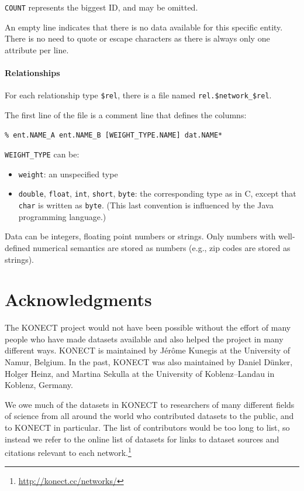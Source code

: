 \documentclass{article}
\begin{document}
\texttt{COUNT} represents the biggest ID, and may be omitted.

An empty line indicates that there is no data available for this specific entity.
There is no need to quote or escape characters as there is always only one attribute per line.

\paragraph{Relationships}

For each relationship type \texttt{\$rel}, there is a file named
\texttt{rel.\$network\_\$rel}. 

The first line of the file is a comment line that defines the columns: 

\texttt{\% ent.NAME\_A ent.NAME\_B [WEIGHT\_TYPE.NAME] dat.NAME*}

\texttt{WEIGHT\_TYPE} can be:
\begin{itemize}
  \item \texttt{weight}: an unspecified type
  \item \texttt{double}, \texttt{float}, \texttt{int}, \texttt{short}, \texttt{byte}: the corresponding type as in
    C, except that \texttt{char} is written as \texttt{byte}.  (This
    last convention is influenced by the Java programming language.)
\end{itemize}

Data can be integers, floating point numbers or strings.  Only numbers
with well-defined numerical semantics are stored as numbers (e.g., zip codes are
stored as strings). 

\section*{Acknowledgments}
The KONECT project would not have been possible without the
effort of many people who have made datasets available and also helped
the project in many different ways.   
KONECT is maintained by Jérôme Kunegis at the University of Namur, Belgium. 
In the past, KONECT was also maintained by Daniel Dünker, Holger Heinz,
and Martina Sekulla at the University of Koblenz--Landau in Koblenz, Germany. 

We owe much of the datasets in KONECT to researchers of many different
fields of science from all around the world who contributed datasets to
the public, and to KONECT in particular.  The list of contributors would
be too long to list, so instead we refer to the online list of datasets
for links to dataset sources and citations relevant to each
network.\footnote{\url{http://konect.cc/networks/}}
\end{document}
